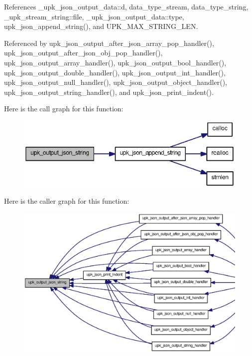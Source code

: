 References \_\-upk\_\-json\_\-output\_\-data::d, data\_\-type\_\-stream, data\_\-type\_\-string, \_\-upk\_\-stream\_\-string::file, \_\-upk\_\-json\_\-output\_\-data::type, upk\_\-json\_\-append\_\-string(), and UPK\_\-MAX\_\-STRING\_\-LEN.



Referenced by upk\_\-json\_\-output\_\-after\_\-json\_\-array\_\-pop\_\-handler(), upk\_\-json\_\-output\_\-after\_\-json\_\-obj\_\-pop\_\-handler(), upk\_\-json\_\-output\_\-array\_\-handler(), upk\_\-json\_\-output\_\-bool\_\-handler(), upk\_\-json\_\-output\_\-double\_\-handler(), upk\_\-json\_\-output\_\-int\_\-handler(), upk\_\-json\_\-output\_\-null\_\-handler(), upk\_\-json\_\-output\_\-object\_\-handler(), upk\_\-json\_\-output\_\-string\_\-handler(), and upk\_\-json\_\-print\_\-indent().



Here is the call graph for this function:
\nopagebreak
\begin{figure}[H]
\begin{center}
\leavevmode
\includegraphics[width=400pt]{upk__json_8c_a7778d21faa09208bfba7f29f8723153d_cgraph}
\end{center}
\end{figure}




Here is the caller graph for this function:
\nopagebreak
\begin{figure}[H]
\begin{center}
\leavevmode
\includegraphics[width=400pt]{upk__json_8c_a7778d21faa09208bfba7f29f8723153d_icgraph}
\end{center}
\end{figure}


